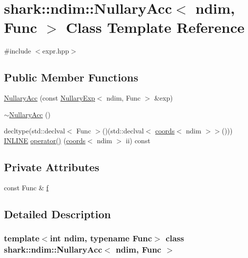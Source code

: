 \hypertarget{classshark_1_1ndim_1_1_nullary_acc}{}\section{shark\+:\+:ndim\+:\+:Nullary\+Acc$<$ ndim, Func $>$ Class Template Reference}
\label{classshark_1_1ndim_1_1_nullary_acc}


{\ttfamily \#include $<$expr.\+hpp$>$}

\subsection*{Public Member Functions}
\begin{DoxyCompactItemize}
\item 
\hyperlink{classshark_1_1ndim_1_1_nullary_acc_a65629401dcf916c324bff4f5012688ff}{Nullary\+Acc} (const \hyperlink{classshark_1_1ndim_1_1_nullary_exp}{Nullary\+Exp}$<$ ndim, Func $>$ \&exp)
\item 
\hyperlink{classshark_1_1ndim_1_1_nullary_acc_a34d1a64e5e395fb4ca2fa636ee164c1c}{$\sim$\+Nullary\+Acc} ()
\item 
decltype(std\+::declval$<$ Func $>$()(std\+::declval$<$ \hyperlink{structshark_1_1ndim_1_1coords}{coords}$<$ ndim $>$$>$())) \hyperlink{common_8hpp_a2eb6f9e0395b47b8d5e3eeae4fe0c116}{I\+N\+L\+I\+NE} \hyperlink{classshark_1_1ndim_1_1_nullary_acc_a54d80a3d684587e7ca45d780e4832faf}{operator()} (\hyperlink{structshark_1_1ndim_1_1coords}{coords}$<$ ndim $>$ ii) const
\end{DoxyCompactItemize}
\subsection*{Private Attributes}
\begin{DoxyCompactItemize}
\item 
const Func \& \hyperlink{classshark_1_1ndim_1_1_nullary_acc_a2818f289b8c710f249e38a20412cf54d}{f}
\end{DoxyCompactItemize}


\subsection{Detailed Description}
\subsubsection*{template$<$int ndim, typename Func$>$\newline
class shark\+::ndim\+::\+Nullary\+Acc$<$ ndim, Func $>$}

